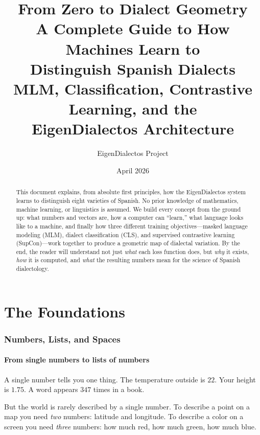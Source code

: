 \documentclass[11pt,a4paper]{article}
\title{%
  \textbf{From Zero to Dialect Geometry}\\[0.3em]
  \Large A Complete Guide to How Machines Learn to\\
  Distinguish Spanish Dialects\\[0.5em]
  \large MLM, Classification, Contrastive Learning, and the\\
  EigenDialectos Architecture
}
\author{EigenDialectos Project}
\date{April 2026}
\theoremstyle{definition}
\begin{document}
\maketitle
\thispagestyle{empty}

\begin{abstract}
This document explains, from absolute first principles, how the
EigenDialectos system learns to distinguish eight varieties of Spanish.
No prior knowledge of mathematics, machine learning, or linguistics is
assumed. We build every concept from the ground up: what numbers and
vectors are, how a computer can ``learn,'' what language looks like to a
machine, and finally how three different training objectives---masked
language modeling (MLM), dialect classification (CLS), and supervised
contrastive learning (SupCon)---work together to produce a geometric
map of dialectal variation. By the end, the reader will understand not
just \emph{what} each loss function does, but \emph{why} it exists,
\emph{how} it is computed, and \emph{what} the resulting numbers mean
for the science of Spanish dialectology.
\end{abstract}

\tableofcontents
\newpage

\part{The Foundations}

\section{Numbers, Lists, and Spaces}
\label{sec:vectors}

\subsection{From single numbers to lists of numbers}

A single number tells you one thing. The temperature outside is $22$.
Your height is $1.75$. A word appears $347$ times in a book.

But the world is rarely described by a single number. To describe a
point on a map you need \emph{two} numbers: latitude and longitude. To
describe a color on a screen you need \emph{three} numbers: how much
red, how much green, how much blue.
\end{document}
